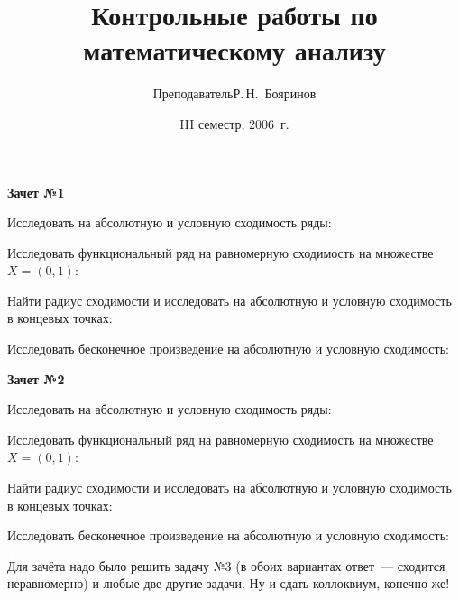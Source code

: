 \documentclass[a4paper,12pt]{article}
\title{Контрольные работы по математическому анализу}
\date{III семестр, 2006~г.}
\author{Преподаватель\т Р.\,Н.\, Бояринов}
\begin{document}
\maketitle

\centerline{\textbf{Зачет №1}}
\smallskip

Исследовать на абсолютную и условную сходимость ряды:

Исследовать функциональный ряд на равномерную сходимость на
множестве $X=(0,1)$:

Найти радиус сходимости и исследовать на абсолютную
и условную сходимость в концевых точках:

Исследовать бесконечное произведение на абсолютную и условную
сходимость:

\bigskip

\centerline{\textbf{Зачет №2}}
\smallskip

Исследовать на абсолютную и условную сходимость ряды:

Исследовать функциональный ряд на равномерную сходимость на
множестве $X=(0,1)$:

Найти радиус сходимости и исследовать на абсолютную
и условную сходимость в концевых точках:

Исследовать бесконечное произведение на абсолютную и условную
сходимость:

Для зачёта надо было решить задачу №3 (в обоих вариантах ответ~--- сходится неравномерно)
и любые две другие задачи. Ну и сдать
коллоквиум, конечно же!
\medskip
\dmvntrail
\end{document}
